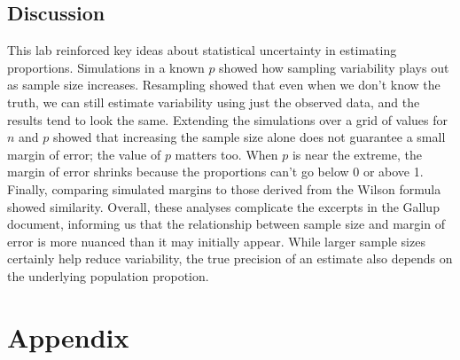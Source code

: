 \documentclass{article}\usepackage[]{graphicx}\usepackage[]{xcolor}
\begin{document}
\begin{multicols}{2}
\section{Discussion}
This lab reinforced key ideas about statistical uncertainty in estimating 
proportions. Simulations in a known $p$ showed how sampling variability plays
out as sample size increases. Resampling showed that even when we don't know
the truth, we can still estimate variability using just the observed data, and
the results tend to look the same. Extending the simulations over a grid of
values for $n$ and $p$ showed that increasing the sample size alone does not
guarantee a small margin of error; the value of $p$ matters too. When $p$
is near the extreme, the margin of error shrinks because the proportions can't
go below 0 or above 1. Finally, comparing simulated margins to those derived
from the Wilson formula showed similarity. Overall, these analyses complicate 
the excerpts in the Gallup document, informing us that the relationship between
sample size and margin of error is more nuanced than it may initially appear. While
larger sample sizes certainly help reduce variability, the true precision of an estimate
also depends on the underlying population propotion. 

\vspace{2em}

\begin{tiny}

\end{tiny}
\end{multicols}

\newpage
\onecolumn
\section{Appendix}
\end{document}
